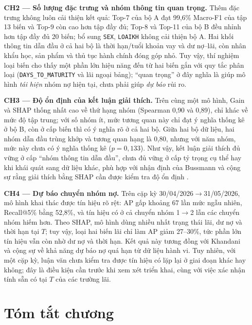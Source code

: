 \medskip
\noindent\textbf{CH2 --- Số lượng đặc trưng và nhóm thông tin quan trọng.} Thêm đặc trưng không luôn cải thiện kết quả: Top-7 của bộ A đạt 99,6\% Macro-F1 của tập 13 biến và Top-9 còn cao hơn tập đầy đủ; Top-8 và Top-11 của bộ B đều nhỉnh hơn tập đầy đủ 20 biến; bổ sung \texttt{SEX}, \texttt{LOAIKH} không cải thiện bộ A. Hai khối thông tin dẫn đầu ở cả hai bộ là thời hạn/tuổi khoản vay và dư nợ--lãi, còn nhân khẩu học, sản phẩm và thủ tục hành chính đóng góp nhỏ. Tuy vậy, thí nghiệm loại biến cho thấy một phần lớn hiệu năng đến từ hai biến gắn với quy tắc phân loại (\mbox{\texttt{DAYS\_TO\_MATURITY}} và lãi ngoại bảng); ``quan trọng'' ở đây nghĩa là giúp mô hình \emph{tái hiện} nhóm nợ hiện tại, chưa phải giúp \emph{dự báo} rủi ro.

\medskip
\noindent\textbf{CH3 --- Độ ổn định của kết luận giải thích.} Trên cùng một mô hình, Gain và SHAP thống nhất cao về thứ hạng nhóm (Spearman 0,90 và 0,89), chỉ khác về mức độ tập trung; với số nhóm ít, mức tương quan này chỉ đạt ý nghĩa thống kê ở bộ B, còn ở cấp biến thì có ý nghĩa rõ ở cả hai bộ. Giữa hai bộ dữ liệu, hai nhóm dẫn đầu trùng khớp và tương quan hạng là 0,80, nhưng với năm nhóm, mức này chưa có ý nghĩa thống kê ($p=0,133$). Như vậy, kết luận giải thích đủ vững ở cấp ``nhóm thông tin dẫn đầu'', chưa đủ vững ở cấp tỷ trọng cụ thể hay khi khái quát sang dữ liệu khác, phù hợp với nhận định của Bussmann và cộng sự rằng giải thích bằng SHAP cần được kiểm tra độ ổn định \cite{bussmann2021explainable}.

\medskip
\noindent\textbf{CH4 --- Dự báo chuyển nhóm nợ.} Trên cặp kỳ 30/04/2026$\to$31/05/2026, mô hình khai thác được tín hiệu rõ rệt: AP gấp khoảng 67 lần mức ngẫu nhiên, Recall@5\% bằng 52,8\%, và tín hiệu có ở cả chuyển nhóm 1$\to$2 lẫn các chuyển nhóm hiếm hơn. Theo SHAP, mô hình dùng nhiều nhất trạng thái lãi, dư nợ và thời hạn tại $T$; tuy vậy, loại hai biến lãi chỉ làm AP giảm 27--30\%, tức phần lớn tín hiệu vẫn còn nhờ dư nợ và thời hạn. Kết quả này tương đồng với Khandani và cộng sự \cite{khandani2010consumer} về khả năng dự báo nợ quá hạn từ dữ liệu hành vi. Tuy nhiên, với một cặp kỳ, luận văn chưa kiểm tra được tín hiệu có lặp lại ở giai đoạn khác hay không; đây là điều kiện cần trước khi xem xét triển khai, cùng với việc xác nhận tính sẵn có tại $T$ của các trường lãi.

\section*{Tóm tắt chương}

